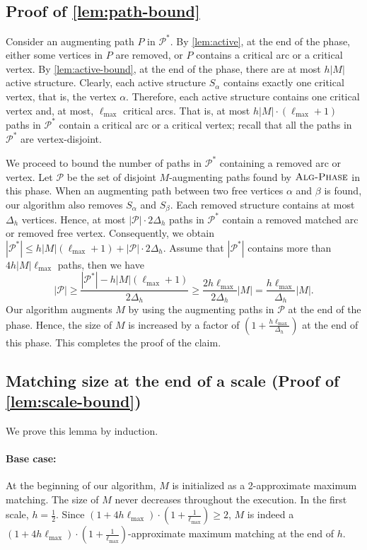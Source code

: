\documentclass{article}
\newcommand{\alp}{\alpha}
\newcommand{\lmax}{\ell_{\max}}
\newcommand{\calP}{\mathcal{P}}
\newcommand{\algPhase}{\textsc{Alg-Phase}\xspace}
\newcommand{\rb}[1]{\left( #1 \right)}
\begin{document}
\subsection{Proof of \cref{lem:path-bound}}
\label{sec:proof-path-bound}
Consider an augmenting path $P$ in $\calP^*$. By \cref{lem:active}, at the end of the phase, either some vertices in $P$ are removed, or $P$ contains a critical arc or a critical vertex.
By \cref{lem:active-bound}, at the end of the phase, there are at most $h|M|$ active structure.
Clearly, each active structure $S_\alp$ contains exactly one critical vertex, that is, the vertex $\alp$.
Therefore, each active structure contains one critical vertex and, at most, $\lmax$ critical arcs.
That is, at most $h|M| \cdot (\lmax + 1)$ paths in $\calP^*$ contain a critical arc or a critical vertex; recall that all the paths in $\calP^*$ are vertex-disjoint.

We proceed to bound the number of paths in $\calP^*$ containing a removed arc or vertex.
Let $\calP$ be the set of disjoint $M$-augmenting paths found by $\algPhase$ in this phase.
When an augmenting path between two free vertices $\alp$ and $\beta$ is found, our algorithm also removes $S_\alp$ and $S_\beta$.
Each removed structure contains at most $\Delta_h$ vertices.
Hence, at most $|\calP| \cdot 2\Delta_h$ paths in $\calP^*$ contain a removed matched arc or removed free vertex.
Consequently, we obtain $|\calP^*| \leq h|M|(\lmax + 1) + |\calP| \cdot 2\Delta_h$.
Assume that $|\calP^*|$ contains more than $4h|M|\lmax$ paths, then we have
\[
    |\calP|
    \geq \frac{|\calP^*| - h|M|(\lmax + 1)}{2\Delta_h}
    \geq \frac{2h\lmax}{2\Delta_h}|M|
    = \frac{h\lmax}{\Delta_h}|M|.
\]
Our algorithm augments $M$ by using the augmenting paths in $\calP$ at the end of the phase.
Hence, the size of $M$ is increased by a factor of $(1 + \frac{h\lmax}{\Delta_h})$ at the end of this phase.
This completes the proof of the claim.


\subsection{Matching size at the end of a scale (Proof of \cref{lem:scale-bound})}
\label{sec:proof-scale-bound}
We prove this lemma by induction.

\paragraph{Base case:} 
At the beginning of our algorithm, $M$ is initialized as a 2-approximate maximum matching. The size of $M$ never decreases throughout the execution. In the first scale, $h = \frac{1}{2}$. 
Since $\rb{1 + 4h\lmax} \cdot \rb{1 + \frac{1}{\lmax}} \geq 2$, $M$ is indeed a $\rb{1 + 4h\lmax} \cdot \rb{1 + \frac{1}{\lmax}}$-approximate maximum matching at the end of $h$.
    
\end{document}
